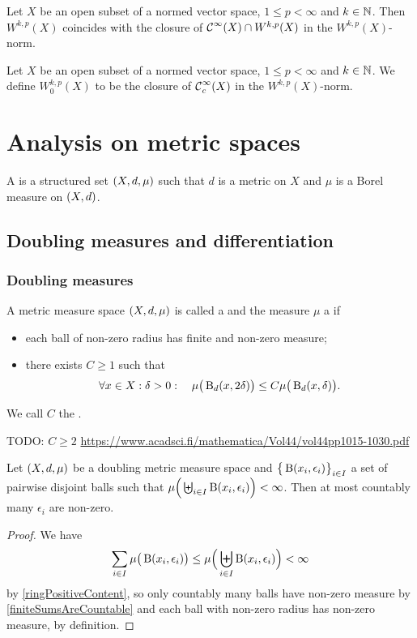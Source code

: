 \begin{proposition}
Let $X$ be an open subset of a normed vector space, $1\leq p < \infty$ and $k\in\mathbb{N}$. Then $W^{k,p}(X)$ coincides with the closure of $\operatorname{\mathcal{C}}^\infty(X) \cap W^{k,p}(X)$ in the $W^{k,p}(X)$-norm.
\end{proposition}

\begin{definition}
Let $X$ be an open subset of a normed vector space, $1\leq p < \infty$ and $k\in\mathbb{N}$. We define $W_0^{k,p}(X)$ to be the closure of $\operatorname{\mathcal{C}}^\infty_c(X)$ in the $W^{k,p}(X)$-norm.
\end{definition}






\chapter{Analysis on metric spaces}
\begin{definition}
A  is a structured set $\sSet{X, d, \mu}$ such that $d$ is a metric on $X$ and $\mu$ is a Borel measure on $\sSet{X,d}$.
\end{definition}
\section{Doubling measures and differentiation}
\subsection{Doubling measures}
\begin{definition}
A metric measure space $\sSet{X,d,\mu}$ is called a  and the measure $\mu$ a  if
\begin{itemize}
\item each ball of non-zero radius has finite and non-zero measure;
\item there exists $C\geq 1$ such that
\[ \forall x\in X: \delta >0:\quad \mu\big(\operatorname{B}_d(x, 2\delta)\big) \leq C \mu\big(\operatorname{B}_d(x, \delta)\big). \]
\end{itemize}
We call $C$ the .
\end{definition}
TODO: $C\geq 2$ \url{https://www.acadsci.fi/mathematica/Vol44/vol44pp1015-1030.pdf}

\begin{lemma} \label{doublingMeasureFiniteMeasureOfBallsImpliesCountableCollection}
Let $\sSet{X,d,\mu}$ be a doubling metric measure space and $\big\{\operatorname{B}(x_i, \epsilon_i)\big\}_{i\in I}$ a set of pairwise disjoint balls such that $\mu\Big(\biguplus_{i\in I}\operatorname{B}(x_i, \epsilon_i)\Big) < \infty$. Then at most countably many $\epsilon_i$ are non-zero.
\end{lemma}
\begin{proof}
We have
\[ \sum_{i\in I}\mu\big(\operatorname{B}(x_i, \epsilon_i)\big) \leq \mu\Big(\biguplus_{i\in I}\operatorname{B}(x_i, \epsilon_i)\Big) < \infty \]
by \ref{ringPositiveContent}, so only countably many balls have non-zero measure by \ref{finiteSumsAreCountable} and each ball with non-zero radius has non-zero measure, by definition.
\end{proof}

